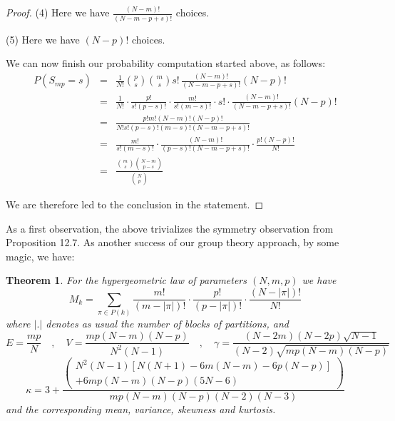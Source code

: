 \documentclass[12pt]{amsbook}
\newtheorem{theorem}{Theorem}[chapter]
\begin{document}
\begin{proof}
\medskip

(4) Here we have $\frac{(N-m)!}{(N-m-p+s)!}$ choices.

\medskip

(5) Here we have $(N-p)!$ choices.

\medskip

We can now finish our probability computation started above, as follows:
\begin{eqnarray*}
P(S_{mp}=s)
&=&\frac{1}{N!}\binom{p}{s}\binom{m}{s}s!\,\frac{(N-m)!}{(N-m-p+s)!}(N-p)!\\
&=&\frac{1}{N!}\cdot\frac{p!}{s!(p-s)!}\cdot\frac{m!}{s!(m-s)!}\cdot s!\cdot\frac{(N-m)!}{(N-m-p+s)!}(N-p)!\\
&=&\frac{p!m!(N-m)!(N-p)!}{N!s!(p-s)!(m-s)!(N-m-p+s)!}\\
&=&\frac{m!}{s!(m-s)!}\cdot\frac{(N-m)!}{(p-s)!(N-m-p+s)!}\cdot\frac{p!(N-p)!}{N!}\\
&=&\frac{\binom{m}{s}\binom{N-m}{p-s}}{\binom{N}{p}}
\end{eqnarray*}

We are therefore led to the conclusion in the statement.
\end{proof}

As a first observation, the above trivializes the symmetry observation from Proposition 12.7. As another success of our group theory approach, by some magic, we have:


\begin{theorem}
For the hypergeometric law of parameters $(N,m,p)$ we have
$$M_k=\sum_{\pi\in P(k)}\frac{m!}{(m-|\pi|)!}\cdot\frac{p!}{(p-|\pi|)!}\cdot\frac{(N-|\pi|)!}{N!}$$
where $|.|$ denotes as usual the number of blocks of partitions, and
$$E=\frac{mp}{N}\quad,\quad V=\frac{mp(N-m)(N-p)}{N^2(N-1)}\quad,\quad 
\gamma=\frac{(N-2m)(N-2p)\sqrt{N-1}}{(N-2)\sqrt{mp(N-m)(N-p)}}$$
$$\kappa=3+\frac{\begin{pmatrix}N^2(N-1)[N(N+1)-6m(N-m)-6p(N-p)]\\
+6mp(N-m)(N-p)(5N-6)\end{pmatrix}}{mp(N-m)(N-p)(N-2)(N-3)}$$
and the corresponding mean, variance, skewness and kurtosis.
\end{theorem}
\end{document}
